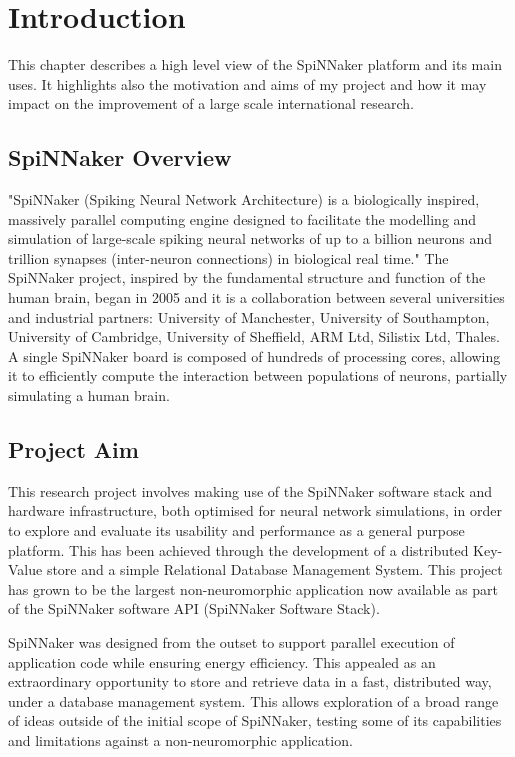 \chapter{Introduction}
\label{cha:intro}

This chapter describes a high level view of the SpiNNaker platform and its main uses. It highlights also the motivation and aims of my project and how it may impact on the improvement of a large scale international research.

\section{SpiNNaker Overview}
\label{sec:overview}

"SpiNNaker (Spiking Neural Network Architecture) is a biologically inspired, massively parallel computing engine designed to facilitate the modelling and simulation of large-scale spiking neural networks of up to a billion neurons and trillion synapses (inter-neuron connections) in biological real time." \cite{painkras} The SpiNNaker project, inspired by the fundamental structure and function of the human brain, began in 2005 and it is a collaboration between several universities and industrial partners: University of Manchester, University of Southampton, University of Cambridge, University of Sheffield, ARM Ltd, Silistix Ltd, Thales. \cite{spinnproject} A single SpiNNaker board is composed of hundreds of processing cores, allowing it to efficiently compute the interaction between populations of neurons, partially simulating a human brain.

\section{Project Aim}
\label{sec:aim}

This research project involves making use of the SpiNNaker software stack and hardware infrastructure, both optimised for neural network simulations, in order to explore and evaluate its usability and performance as a general purpose platform. This has been achieved through the development of a distributed Key-Value store and a simple Relational Database Management System. 
This project has grown to be the largest non-neuromorphic application now available as part of the SpiNNaker software API (SpiNNaker Software Stack).

SpiNNaker was designed from the outset to support parallel execution of application code while ensuring energy efficiency. This appealed as an extraordinary opportunity to store and retrieve data in a fast, distributed way, under a database management system. This allows exploration of a broad range of ideas outside of the initial scope of SpiNNaker, testing some of its capabilities and limitations against a non-neuromorphic application.

